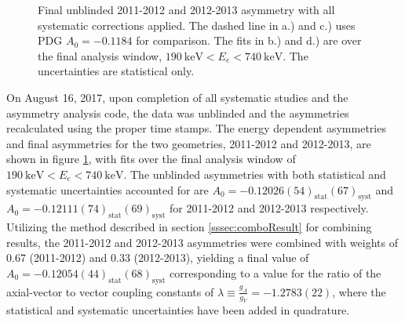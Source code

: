 \begin{figure}[h]
  \caption{Final unblinded 2011-2012 and 2012-2013 asymmetry with all systematic corrections applied. The dashed line in
    a.) and c.) uses PDG $A_0=-0.1184$ for comparison. The fits in b.) and d.) are over the
    final analysis window, $190\mathrm{~keV} < E_e < 740\mathrm{~keV}$. The uncertainties are statistical only.}
  \label{fig:FinalA}
\end{figure}

On August 16, 2017, upon completion of all systematic studies and the asymmetry analysis code, the data
was unblinded and the asymmetries recalculated using the proper time stamps. The energy dependent asymmetries
and final asymmetries for the two geometries, 2011-2012 and 2012-2013, are shown in figure \ref{fig:FinalA},
with fits over the final analysis window of $190\mathrm{~keV} < E_e < 740\mathrm{~keV}$.
The unblinded asymmetries with both statistical and systematic uncertainties accounted for
are $A_0=-0.12026(54)_{\mathrm{stat}}(67)_{\mathrm{syst}}$ and $A_0=-0.12111(74)_{\mathrm{stat}}(69)_{\mathrm{syst}}$
for 2011-2012 and 2012-2013 respectively.
Utilizing the method described in section
\ref{sssec:comboResult} for combining results, the 2011-2012 and 2012-2013 asymmetries were combined
with weights of 0.67 (2011-2012) and 0.33 (2012-2013), yielding a final value of
$A_0=-0.12054(44)_{\mathrm{stat}}(68)_{\mathrm{syst}}$ corresponding to a
value for the ratio of the axial-vector to vector coupling constants of
$\lambda\equiv \frac{g_{A}}{g_{V}}=-1.2783(22)$, where the statistical and systematic
uncertainties have been added in quadrature.

